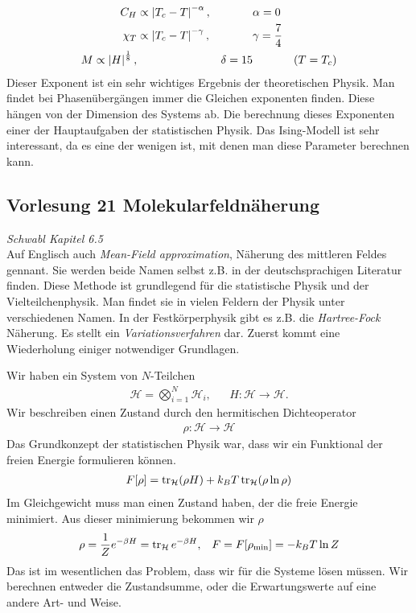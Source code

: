 \begin{description}
\begin{align*}
       C_H & \propto \left| T_c - T \right|^{-\alpha}, && \alpha = 0 \\
       \chi_T & \propto \left|  T_c - T \right| ^{-\gamma}, && \gamma = \frac{7}{4} \\
       M \propto \left| H \right|^{\frac{1}{8}}, && \delta = 15 && (T = T_c) \\
     \end{align*}
     Dieser Exponent ist ein sehr wichtiges Ergebnis der theoretischen Physik.
     Man findet bei Phasenübergängen immer die Gleichen exponenten finden.
     Diese hängen von der Dimension des Systems ab. Die berechnung dieses
     Exponenten einer der Hauptaufgaben der statistischen Physik. Das Ising-Modell
     ist sehr interessant, da es eine der wenigen ist, mit denen man diese Parameter
     berechnen kann.
  
\end{description}



\subsection*{Vorlesung 21 Molekularfeldnäherung}
\emph{Schwabl Kapitel 6.5}\\
Auf Englisch auch \emph{Mean-Field approximation}, Näherung des mittleren 
Feldes gennant. Sie werden beide Namen selbst z.B. in der deutschsprachigen
Literatur finden. Diese Methode ist grundlegend für die statistische Physik
und der Vielteilchenphysik. Man findet sie in vielen Feldern der Physik unter
verschiedenen Namen. In der Festkörperphysik gibt es z.B. die \emph{Hartree-Fock}
Näherung. Es stellt ein \emph{Variationsverfahren} dar. Zuerst kommt eine 
Wiederholung einiger notwendiger Grundlagen.

Wir haben ein System von $N$-Teilchen
%
\begin{align*}
  \mathcal{H} = \bigotimes_{i=1}^{N} \mathcal{H}_i, && H: \mathcal{H} \to \mathcal{H}.
\end{align*}
%
Wir beschreiben einen Zustand durch den hermitischen Dichteoperator
%
\begin{align*}
  \rho: \mathcal{H} \to \mathcal{H}
\end{align*}
%
Das Grundkonzept der statistischen Physik war, dass wir ein Funktional
der freien Energie formulieren können.
%
\begin{align*}
  F[\rho] = \operatorname{tr}_{\mathcal{H}} (\rho H) + k_B T \operatorname{tr}_\mathcal{H}(\rho \ln{\rho})
\end{align*}
%
Im Gleichgewicht muss man einen Zustand haben, der die freie Energie minimiert.
Aus dieser minimierung bekommen wir $\rho$
%
\begin{align*}
  \rho = \frac{1}{Z} e ^{-\beta H} = \operatorname{tr}_{\mathcal{H}} e^{-\beta H} , &&
  F = F[\rho_\text{min}] = - k_B T \ln{ Z}
\end{align*}
%
Das ist im wesentlichen das Problem, dass wir für die Systeme lösen müssen.
Wir berechnen entweder die Zustandsumme, oder die Erwartungswerte 
auf eine andere Art- und Weise.


